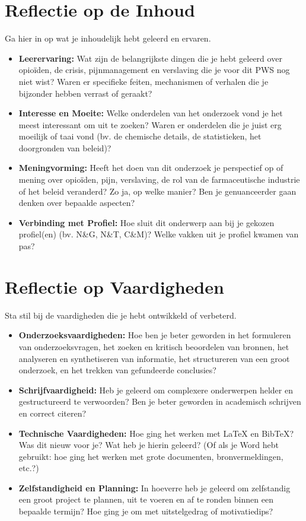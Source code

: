 \documentclass[11pt, a4paper]{report} %
\begin{document}
\section{Reflectie op de Inhoud}
Ga hier in op wat je inhoudelijk hebt geleerd en ervaren.
\begin{itemize}
    \item \textbf{Leerervaring:} Wat zijn de belangrijkste dingen die je hebt geleerd over opioïden, de crisis, pijnmanagement en verslaving die je voor dit PWS nog niet wist? Waren er specifieke feiten, mechanismen of verhalen die je bijzonder hebben verrast of geraakt?
    \item \textbf{Interesse en Moeite:} Welke onderdelen van het onderzoek vond je het meest interessant om uit te zoeken? Waren er onderdelen die je juist erg moeilijk of taai vond (bv. de chemische details, de statistieken, het doorgronden van beleid)?
    \item \textbf{Meningvorming:} Heeft het doen van dit onderzoek je perspectief op of mening over opioïden, pijn, verslaving, de rol van de farmaceutische industrie of het beleid veranderd? Zo ja, op welke manier? Ben je genuanceerder gaan denken over bepaalde aspecten?
    \item \textbf{Verbinding met Profiel:} Hoe sluit dit onderwerp aan bij je gekozen profiel(en) (bv. N\&G, N\&T, C\&M)? Welke vakken uit je profiel kwamen van pas?
\end{itemize}
\lipsum[4] %

\section{Reflectie op Vaardigheden}
Sta stil bij de vaardigheden die je hebt ontwikkeld of verbeterd.
\begin{itemize}
    \item \textbf{Onderzoeksvaardigheden:} Hoe ben je beter geworden in het formuleren van onderzoeksvragen, het zoeken en kritisch beoordelen van bronnen, het analyseren en synthetiseren van informatie, het structureren van een groot onderzoek, en het trekken van gefundeerde conclusies?
    \item \textbf{Schrijfvaardigheid:} Heb je geleerd om complexere onderwerpen helder en gestructureerd te verwoorden? Ben je beter geworden in academisch schrijven en correct citeren?
    \item \textbf{Technische Vaardigheden:} Hoe ging het werken met LaTeX en BibTeX? Was dit nieuw voor je? Wat heb je hierin geleerd? (Of als je Word hebt gebruikt: hoe ging het werken met grote documenten, bronvermeldingen, etc.?)
    \item \textbf{Zelfstandigheid en Planning:} In hoeverre heb je geleerd om zelfstandig een groot project te plannen, uit te voeren en af te ronden binnen een bepaalde termijn? Hoe ging je om met uitstelgedrag of motivatiedips?
\end{itemize}
\lipsum[5] %
\end{document}
